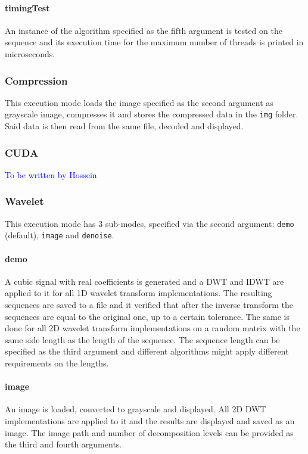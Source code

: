 \paragraph{timingTest} An instance of the algorithm specified as the fifth argument is tested on the sequence and its execution time for the maximum number of threads is printed in microseconds.

\subsubsection{Compression}
This execution mode loads the image specified as the second argument as grayscale image, compresses it and stores the compressed data in the \texttt{img} folder. Said data is then read from the same file, decoded and displayed. 

\subsubsection{CUDA}
\textcolor{blue}{To be written by Hossein}

\subsubsection{Wavelet}
This execution mode has 3 sub-modes, specified via the second argument: \texttt{demo} (default), \texttt{image} and \texttt{denoise}.
\paragraph{demo} A cubic signal with real coefficients is generated and a DWT and IDWT are applied to it for all 1D wavelet transform implementations. The resulting sequences are saved to a file and it verified that after the inverse transform the sequences are equal to the original one, up to a certain tolerance. The same is done for all 2D wavelet transform implementations on a random matrix with the same side length as the length of the sequence. The sequence length can be specified as the third argument and different algorithms might apply different requirements on the lengths.
\paragraph{image} An image is loaded, converted to grayscale and displayed. All 2D DWT implementations are applied to it and the results are displayed and saved as an image. The image path and number of decomposition levels can be provided as the third and fourth arguments.
